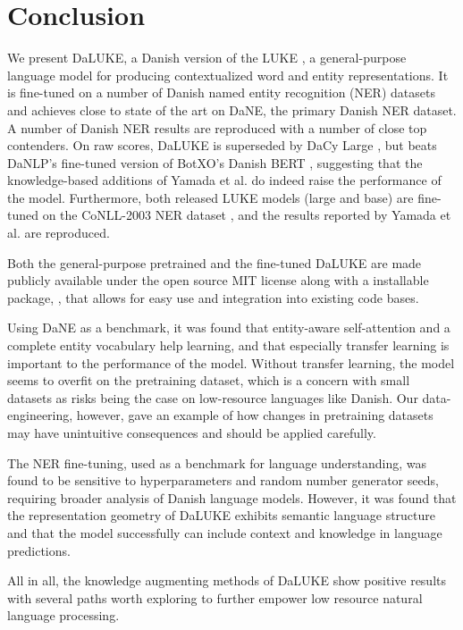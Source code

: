\documentclass[main.tex]{subfiles}
\begin{document}
\chapter{Conclusion}
We present DaLUKE, a Danish version of the LUKE \cite{yamada2020luke}, a general-purpose language model for producing contextualized word and entity representations.
It is fine-tuned on a number of Danish named entity recognition (NER) datasets and achieves close to state of the art on DaNE, the primary Danish NER dataset.
A number of Danish NER results are reproduced with a number of close top contenders.
On raw scores, DaLUKE is superseded by DaCy Large \cite{enevoldsen2020dacy}, but beats DaNLP's fine-tuned version of BotXO's Danish BERT \cite{danlp2021, botxo2019dabert}, suggesting that the knowledge-based additions of Yamada et al. \cite{yamada2020luke} do indeed raise the performance of the model.
Furthermore, both released LUKE models (large and base) are fine-tuned on the CoNLL-2003 NER dataset \cite{tjang2003conll}, and the results reported by Yamada et al. are reproduced.

Both the general-purpose pretrained and the fine-tuned DaLUKE are made publicly available under the open source MIT license \cite{mitlicense} along with a  installable package, , that allows for easy use and integration into existing code bases.

Using DaNE as a benchmark, it was found that entity-aware self-attention and a complete entity vocabulary help learning, and that especially transfer learning is important to the performance of the model.
Without transfer learning, the model seems to overfit on the pretraining dataset, which is a concern with small datasets as risks being the case on low-resource languages like Danish.
Our data-engineering, however, gave an example of how changes in pretraining datasets may have unintuitive consequences and should be applied carefully.

The NER fine-tuning, used as a benchmark for language understanding, was found to be sensitive to hyperparameters and random number generator seeds, requiring broader analysis of Danish language models.
However, it was found that the representation geometry of DaLUKE exhibits semantic language structure and that the model successfully can include context and knowledge in language predictions.

All in all, the knowledge augmenting methods of DaLUKE show positive results with several paths worth exploring to further empower low resource natural language processing.
\end{document}
